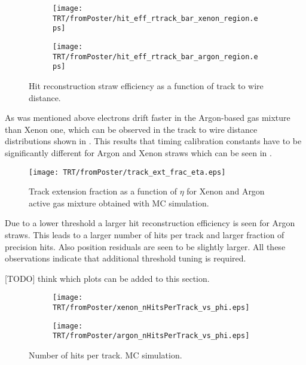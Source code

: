 \begin{figure}

\begin{subfigure}{.5\textwidth}
  \centering
  \texttt{[image: TRT/fromPoster/hit\_eff\_rtrack\_bar\_xenon\_region.eps]}
\end{subfigure}%
\begin{subfigure}{.5\textwidth}
  \centering
  \texttt{[image: TRT/fromPoster/hit\_eff\_rtrack\_bar\_argon\_region.eps]}
\end{subfigure}

\caption{Hit reconstruction straw efficiency as a function of track to wire distance.}
  \label{fig:hit_eff_rtrack_bar}
\end{figure}

As was mentioned above electrons drift faster in the Argon-based gas mixture than Xenon one, which can be observed in the track to wire distance
distributions shown in . 
This results that timing calibration constants have to be significantly different 
for Argon and Xenon straws which can be seen in . 


\begin{figure}
\begin{center}
 \texttt{[image: TRT/fromPoster/track\_ext\_frac\_eta.eps]}
\caption{Track extension fraction as a function of $\eta$ for Xenon and Argon active gas mixture obtained with MC simulation.}
\label{fig:meanFreePath}
\end{center}
\end{figure}



Due to a lower threshold a larger hit reconstruction efficiency is seen for Argon straws. This leads to a
larger number of hits per track and larger fraction of precision hits. Also position residuals are seen to be 
slightly larger. All these observations indicate that additional threshold tuning is required.

[TODO] think which plots can be added to this section.

\begin{figure}

\begin{subfigure}{.5\textwidth}
  \centering
  \texttt{[image: TRT/fromPoster/xenon\_nHitsPerTrack\_vs\_phi.eps]}
\end{subfigure}%
\begin{subfigure}{.5\textwidth}
  \centering
  \texttt{[image: TRT/fromPoster/argon\_nHitsPerTrack\_vs\_phi.eps]}
\end{subfigure}

\caption{Number of hits per track. MC simulation.}
  \label{fig:nPrecHitsPerTrack}
\end{figure}


